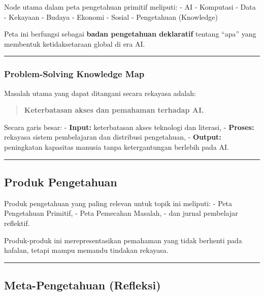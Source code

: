 \documentclass[
  letterpaper,
  DIV=11,
  numbers=noendperiod]{scrreprt}
\begin{document}
Node utama dalam peta pengetahuan primitif meliputi: - AI - Komputasi -
Data - Kekayaan - Budaya - Ekonomi - Sosial - Pengetahuan (Knowledge)

Peta ini berfungsi sebagai \textbf{badan pengetahuan deklaratif} tentang
``apa'' yang membentuk ketidaksetaraan global di era AI.

\begin{center}\rule{0.5\linewidth}{0.5pt}\end{center}

\subsubsection{Problem-Solving Knowledge
Map}\label{problem-solving-knowledge-map}

Masalah utama yang dapat ditangani secara rekayasa adalah:

\begin{quote}
\textbf{Keterbatasan akses dan pemahaman terhadap AI.}
\end{quote}

Secara garis besar: - \textbf{Input:} keterbatasan akses teknologi dan
literasi, - \textbf{Proses:} rekayasa sistem pembelajaran dan distribusi
pengetahuan, - \textbf{Output:} peningkatan kapasitas manusia tanpa
ketergantungan berlebih pada AI.

\begin{center}\rule{0.5\linewidth}{0.5pt}\end{center}

\subsection{Produk Pengetahuan}\label{produk-pengetahuan}

Produk pengetahuan yang paling relevan untuk topik ini meliputi: - Peta
Pengetahuan Primitif, - Peta Pemecahan Masalah, - dan jurnal pembelajar
reflektif.

Produk-produk ini merepresentasikan pemahaman yang tidak berhenti pada
hafalan, tetapi mampu memandu tindakan rekayasa.

\begin{center}\rule{0.5\linewidth}{0.5pt}\end{center}

\subsection{Meta-Pengetahuan
(Refleksi)}\label{meta-pengetahuan-refleksi}
\end{document}

